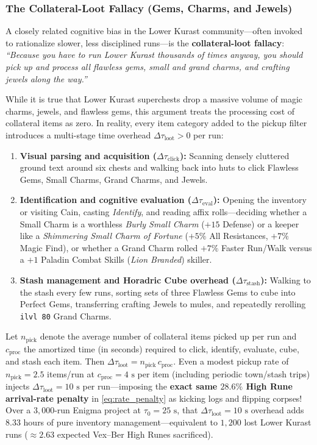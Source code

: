 \documentclass[11pt,reqno]{amsart}
\theoremstyle{definition}
\begin{document}
\subsubsection*{The Collateral-Loot Fallacy (Gems, Charms, and Jewels)}
A closely related cognitive bias in the Lower Kurast community—often invoked to rationalize slower, less disciplined runs—is the \textbf{collateral-loot fallacy}: \emph{``Because you have to run Lower Kurast thousands of times anyway, you should pick up and process all flawless gems, small and grand charms, and crafting jewels along the way.''}

While it is true that Lower Kurast superchests drop a massive volume of magic charms, jewels, and flawless gems, this argument treats the processing cost of collateral items as zero. In reality, every item category added to the pickup filter introduces a multi-stage time overhead $\Delta \tau_{\text{loot}} > 0$ per run:
\begin{enumerate}
    \item \textbf{Visual parsing and acquisition ($\Delta \tau_{\text{click}}$):} Scanning densely cluttered ground text around six chests and walking back into huts to click Flawless Gems, Small Charms, Grand Charms, and Jewels.
    \item \textbf{Identification and cognitive evaluation ($\Delta \tau_{\text{eval}}$):} Opening the inventory or visiting Cain, casting \emph{Identify}, and reading affix rolls—deciding whether a Small Charm is a worthless \emph{Burly Small Charm} ($+15$ Defense) or a keeper like a \emph{Shimmering Small Charm of Fortune} ($+5\%$ All Resistances, $+7\%$ Magic Find), or whether a Grand Charm rolled $+7\%$ Faster Run/Walk versus a $+1$ Paladin Combat Skills (\emph{Lion Branded}) skiller.
    \item \textbf{Stash management and Horadric Cube overhead ($\Delta \tau_{\text{stash}}$):} Walking to the stash every few runs, sorting sets of three Flawless Gems to cube into Perfect Gems, transferring crafting Jewels to mules, and repeatedly rerolling \texttt{ilvl~80} Grand Charms.
\end{enumerate}
Let $n_{\text{pick}}$ denote the average number of collateral items picked up per run and $c_{\text{proc}}$ the amortized time (in seconds) required to click, identify, evaluate, cube, and stash each item. Then $\Delta \tau_{\text{loot}} = n_{\text{pick}}\, c_{\text{proc}}$. Even a modest pickup rate of $n_{\text{pick}} = 2.5$ items/run at $c_{\text{proc}} = 4\text{ s}$ per item (including periodic town/stash trips) injects $\Delta \tau_{\text{loot}} = 10\text{ s}$ per run—imposing the \textbf{exact same $28.6\%$ High Rune arrival-rate penalty} in \eqref{eq:rate_penalty} as kicking logs and flipping corpses! Over a $3{,}000$-run Enigma project at $\tau_0 = 25\text{ s}$, that $\Delta \tau_{\text{loot}} = 10\text{ s}$ overhead adds $8.33$ hours of pure inventory management—equivalent to $1{,}200$ lost Lower Kurast runs ($\approx 2.63$ expected Vex--Ber High Runes sacrificed).
\end{document}
